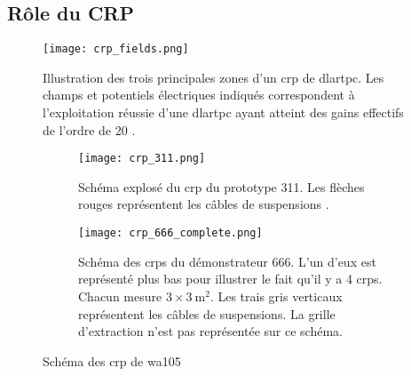         \subsection{Rôle du CRP}\label{sec::crp_intro}
            \begin{figure}[htbp]
                \begin{center}\texttt{[image: crp\_fields.png]}\end{center}
                \caption[Champs électriques d'un  \gls{crp}.]{Illustration des trois principales zones d'un \gls{crp} de \gls{dlartpc}. Les champs et potentiels électriques indiqués correspondent à l'exploitation réussie d'une \gls{dlartpc} ayant atteint des gains effectifs de l'ordre de 20 \cite{Aimard2018,Cantini2014}.}
                \label{fig::crp_fields}
            \end{figure}
            \begin{figure}[htbp]
                \begin{subfigure}[b]{\textwidth}
                    \begin{center}\texttt{[image: crp\_311.png]}\end{center}
                    \caption[\gls{crp} du prototype 311]{Schéma explosé du \gls{crp} du prototype 311. Les flèches rouges représentent les câbles de suspensions \cite{Aimard2018}.}
                    \label{fig::crp_311}
                \end{subfigure}
                \begin{subfigure}[b]{\textwidth}
                    \begin{center}\texttt{[image: crp\_666\_complete.png]}\end{center}
                    \caption[\glspl{crp} du démonstrateur 666]{Schéma des \glspl{crp} du démonstrateur 666. L'un d'eux est représenté plus bas pour illustrer le fait qu'il y a 4 \glspl{crp}. Chacun mesure $3\times\SI{3}{\meter\squared}$. Les trais gris verticaux représentent les câbles de suspensions. La grille d'extraction n'est pas représentée sur ce schéma. \cite{CRPdesign}}
                    \label{fig::crp_666}
                \end{subfigure}
                \caption{Schéma des \gls{crp} de \gls{wa105}}
            \end{figure}
        
